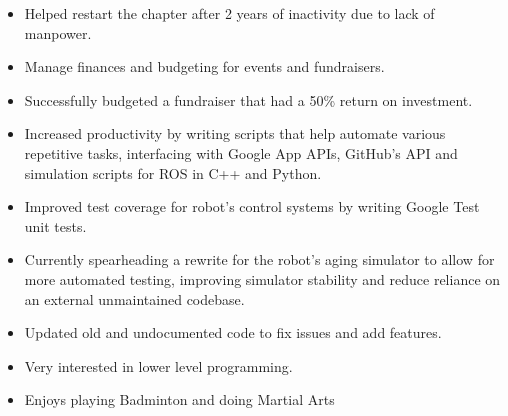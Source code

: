 




\begin{itemize}
  \item Helped restart the chapter after 2 years of inactivity due to lack of manpower.
  \item Manage finances and budgeting for events and fundraisers.
  \item Successfully budgeted a fundraiser that had a 50\% return on investment.
\end{itemize}
\divider\small

\begin{itemize}
  \item Increased productivity by writing scripts that help automate various repetitive tasks, interfacing with Google App APIs, GitHub’s API and simulation scripts for ROS in C++ and Python.
  \item Improved test coverage for robot’s control systems by writing Google Test unit tests.
  \item Currently spearheading a rewrite for the robot’s aging simulator to allow for more automated testing, improving simulator stability and reduce reliance on an external unmaintained codebase.
  \item Updated old and undocumented code to fix issues and add features.
\end{itemize}
\divider\small

\begin{itemize}
  \item Very interested in lower level programming.
  \item Enjoys playing Badminton and doing Martial Arts
\end{itemize}
